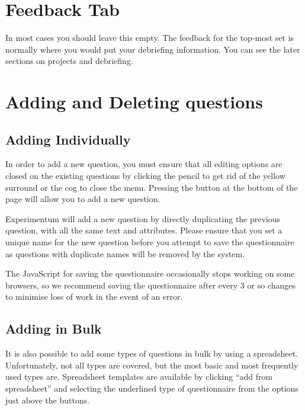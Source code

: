 \documentclass[]{book}
\begin{document}
\hypertarget{feedback-tab}{%
\section{Feedback Tab}\label{feedback-tab}}

In most cases you should leave this empty. The feedback for the top-most set is normally where you would put your debriefing information. You can see the later sections on projects and debriefing.

\hypertarget{adding-and-deleting-questions}{%
\section{Adding and Deleting questions}\label{adding-and-deleting-questions}}

\hypertarget{adding-individually}{%
\subsection{Adding Individually}\label{adding-individually}}

In order to add a new question, you must ensure that all editing options are closed on the existing questions by clicking the pencil to get rid of the yellow surround or the cog to close the menu.
Pressing the button at the bottom of the page will allow you to add a new question.

Experimentum will add a new question by directly duplicating the previous question, with all the same text and attributes. Please ensure that you set a unique name for the new question before you attempt to save the questionnaire as questions with duplicate names will be removed by the system.

\begin{danger}
The JavaScript for saving the questionnaire occasionally stops working
on some browsers, so we recommend saving the questionnaire after every 3
or so changes to minimise loss of work in the event of an error.
\end{danger}

\hypertarget{adding-in-bulk}{%
\subsection{Adding in Bulk}\label{adding-in-bulk}}

It is also possible to add some types of questions in bulk by using a spreadsheet. Unfortunately, not all types are covered, but the most basic and most frequently used types are.
Spreadsheet templates are available by clicking ``add from spreadsheet'' and selecting the underlined type of questionnaire from the options just above the buttons.
\end{document}
